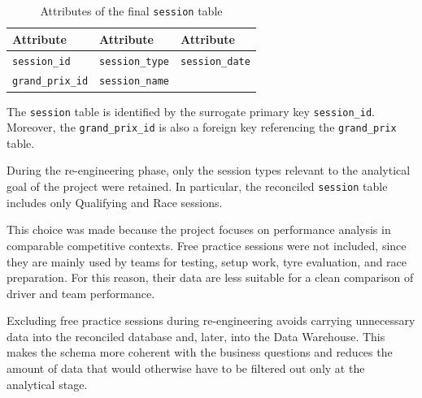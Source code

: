 \documentclass[12pt,a4paper]{article}
\begin{document}
	\begin{table}[H]
		\centering
		\caption{Attributes of the final \texttt{session} table}
		\renewcommand{\arraystretch}{1.15}
		\begin{tabularx}{0.9\textwidth}{>{\raggedright\arraybackslash}X >{\raggedright\arraybackslash}X >{\raggedright\arraybackslash}X}
			\toprule
			\textbf{Attribute} & \textbf{Attribute} & \textbf{Attribute} \\
			\midrule
			\texttt{session\_id}  & \texttt{session\_type} & \texttt{session\_date} \\
			\texttt{grand\_prix\_id} & \texttt{session\_name} &  \\
			\bottomrule
		\end{tabularx}
	\end{table}
		
	The \texttt{session} table is identified by the surrogate primary key \texttt{session\_id}.
	Moreover, the \texttt{grand\_prix\_id} is also a foreign key referencing the \texttt{grand\_prix} table.
	
	
	During the re-engineering phase, only the session types relevant to the analytical goal of the project were retained.
	In particular, the reconciled \texttt{session} table includes only Qualifying and Race sessions.
	
	This choice was made because the project focuses on performance analysis in comparable competitive contexts.
	Free practice sessions were not included, since they are mainly used by teams for testing, setup work, tyre evaluation, and race preparation.
	For this reason, their data are less suitable for a clean comparison of driver and team performance.
	
	Excluding free practice sessions during re-engineering avoids carrying unnecessary data into the reconciled database and, later, into the Data Warehouse.
	This makes the schema more coherent with the business questions and reduces the amount of data that would otherwise have to be filtered out only at the analytical stage.
	
\end{document}
